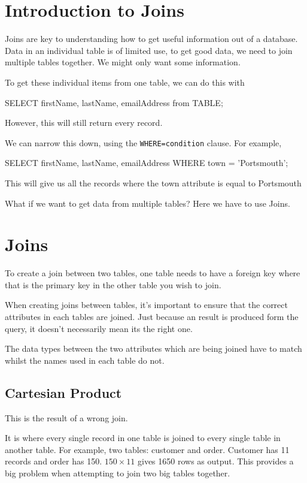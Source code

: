 
\section*{Introduction to Joins}
Joins are key to understanding how to get useful information out of a database. Data in an individual table is of limited use, to get good data, we need to join multiple tables together. We might only want some information.

To get these individual items from one table, we can do this with
\begin{sql}
SELECT firstName, lastName, emailAddress from TABLE;
\end{sql}
However, this will still return every record.

We can narrow this down, using the \texttt{WHERE=condition} clause. For example, 
\begin{sql}
SELECT firstName, lastName, emailAddress WHERE town = 'Portsmouth';
\end{sql}
This will give us all the records where the town attribute is equal to Portsmouth

What if we want to get data from multiple tables? Here we have to use Joins.

\section*{Joins}
To create a join between two tables, one table needs to have a foreign key where that is the primary key in the other table you wish to join. 

When creating joins between tables, it's important to ensure that the correct attributes in each tables are joined. Just because an result is produced form the query, it doesn't necessarily mean its the right one.

The data types between the two attributes which are being joined have to match whilst the names used in each table do not.

\subsection*{Cartesian Product}
This is the result of a wrong join.

It is where every single record in one table is joined to every single table in another table. For example, two tables: customer and order. Customer has 11 records and order has 150. $150 \times 11$ gives 1650 rows as output.
This provides a big problem when attempting to join two big tables together.

